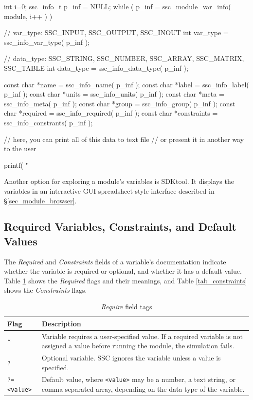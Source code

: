 \documentclass{scrartcl} %
\newcommand{\+}{\discretionary{\mbox{\scriptsize$\hookleftarrow$}}{}{}}
\begin{document}
\begin{verbatimtab}[4]
int i=0;
ssc_info_t p_inf = NULL;
while ( p_inf = ssc_module_var_info( module, i++ ) )
{
	// var_type: SSC_INPUT, SSC_OUTPUT, SSC_INOUT
	int var_type = ssc_info_var_type( p_inf );

	// data_type: SSC_STRING, SSC_NUMBER, SSC_ARRAY, SSC_MATRIX, SSC_TABLE   
	int data_type = ssc_info_data_type( p_inf );
      
	const char *name = ssc_info_name( p_inf );
	const char *label = ssc_info_label( p_inf );
	const char *units = ssc_info_units( p_inf );
	const char *meta = ssc_info_meta( p_inf );
	const char *group = ssc_info_group( p_inf );
	const char *required = ssc_info_required( p_inf );
	const char *constraints = ssc_info_constrants( p_inf );

	// here, you can print all of this data to text file
	// or present it in another way to the user

	printf( "%
}

\end{verbatimtab}

Another option for exploring a module's variables is SDKtool. It displays the variables in an interactive GUI spreadsheet-style interface described in \S\ref{sec_module_browser}.

\subsection{Required Variables, Constraints, and Default Values}
\label{sec_def_const}

The \emph{Required} and \emph{Constraints} fields of a variable's documentation indicate whether the variable is required or optional, and whether it has a default value. Table \ref{tab_required} shows the \emph{Required} flags and their meanings, and Table \ref{tab_constraints} shows the \emph{Constraints} flags. 

\begin{table}[ht]
\begin{center}
\begin{tabular}{p{0.75in}p{4.75in}}
Flag & Description\\
\hline
\texttt{*} &  Variable requires a user-specified value. If a required variable is not assigned a value before running the module, the simulation fails.\\
\texttt{?} & Optional variable. SSC ignores the variable unless a value is specified.\\
\texttt{?=<value>} & Default value, where \texttt{<value>} may be a number, a text string, or comma-separated array, depending on the data type of the variable.\\
\end{tabular}
\caption{\emph{Require} field tags}
\label{tab_required}
\end{center}
\end{table}
\end{document}

